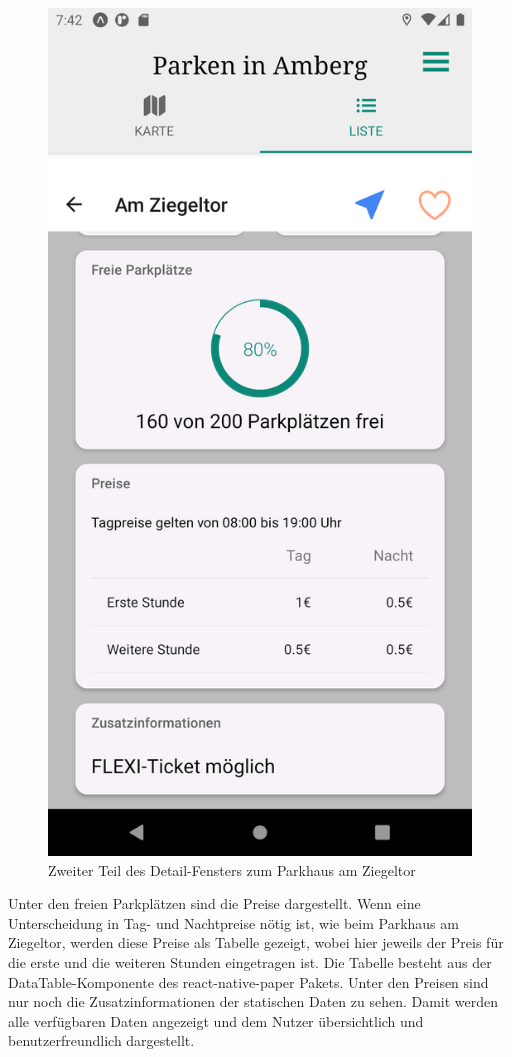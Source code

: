 \begin{figure}
	\vspace{-\baselineskip}
	\centering
	\includegraphics[scale=0.12]{img/details2}
	\caption{Zweiter Teil des Detail-Fensters zum Parkhaus am Ziegeltor}
	\label{fig:details2}
\end{figure}
Unter den freien Parkplätzen sind die Preise dargestellt. Wenn eine Unterscheidung in Tag- und Nachtpreise nötig ist, wie beim Parkhaus am Ziegeltor, werden diese Preise als Tabelle gezeigt, wobei hier jeweils der Preis für die erste und die weiteren Stunden eingetragen ist. Die Tabelle besteht aus der DataTable-Komponente des react-native-paper Pakets. Unter den Preisen sind nur noch die Zusatzinformationen der statischen Daten zu sehen. Damit werden alle verfügbaren Daten angezeigt und dem Nutzer übersichtlich und benutzerfreundlich dargestellt.

